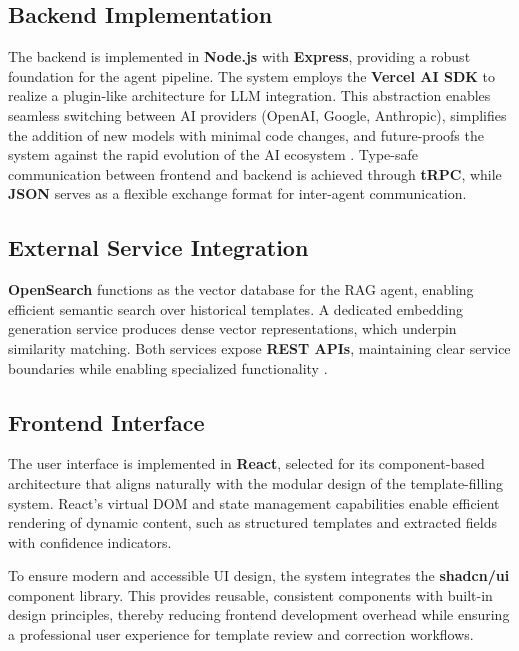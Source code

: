 \subsection*{Backend Implementation}

The backend is implemented in \textbf{Node.js} with \textbf{Express}, providing a robust foundation for the agent pipeline. The system employs the \textbf{Vercel AI SDK} to realize a plugin-like architecture for LLM integration. This abstraction enables seamless switching between AI providers (OpenAI, Google, Anthropic), simplifies the addition of new models with minimal code changes, and future-proofs the system against the rapid evolution of the AI ecosystem \cite{llm_orchestration_survey}. Type-safe communication between frontend and backend is achieved through \textbf{tRPC}, while \textbf{JSON} serves as a flexible exchange format for inter-agent communication.

\subsection*{External Service Integration}

\textbf{OpenSearch} functions as the vector database for the RAG agent, enabling efficient semantic search over historical templates. A dedicated embedding generation service produces dense vector representations, which underpin similarity matching. Both services expose \textbf{REST APIs}, maintaining clear service boundaries while enabling specialized functionality \cite{opensearch_knn}.

\subsection*{Frontend Interface}

The user interface is implemented in \textbf{React}, selected for its component-based architecture that aligns naturally with the modular design of the template-filling system. React's virtual DOM and state management capabilities enable efficient rendering of dynamic content, such as structured templates and extracted fields with confidence indicators.

To ensure modern and accessible UI design, the system integrates the \textbf{shadcn/ui} component library. This provides reusable, consistent components with built-in design principles, thereby reducing frontend development overhead while ensuring a professional user experience for template review and correction workflows.


